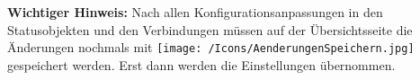 \vspace{\baselineskip}

\textbf{Wichtiger Hinweis:} Nach allen Konfigurationsanpassungen in den Statusobjekten und den Verbindungen müssen auf der Übersichtsseite die Änderungen nochmals mit \texttt{[image: /Icons/AenderungenSpeichern.jpg]} gespeichert werden. Erst dann werden die Einstellungen übernommen.


